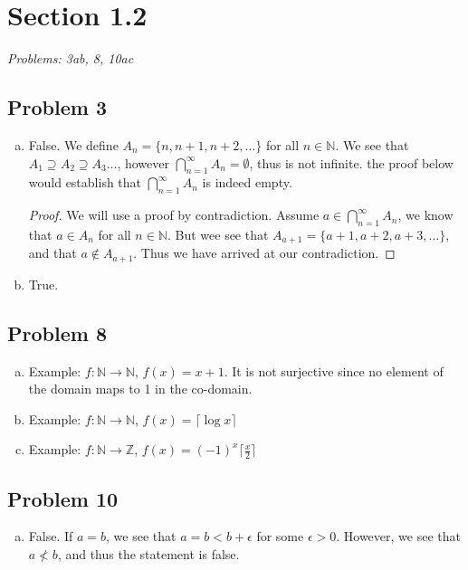 \documentclass[12pt]{article}
\begin{document}

\section*{Section 1.2}
\textit{Problems: 3ab, 8, 10ac }

\subsection*{Problem 3}
\begin{enumerate}[a).]
    \item {
    False.
    We define $A_n = \{n, n+1, n+2, \dots\}$ for all $n \in \mathbb{N}$. 
    We see that $A_1 \supseteq A_2 \supseteq A_3 \dots$, however $\bigcap_{n=1}^{\infty}A_n = \emptyset$, thus is not infinite.
    the proof below would establish that $\bigcap_{n=1}^{\infty}A_n$ is indeed empty. 

    \begin{proof}
        We will use a proof by contradiction. 
        Assume $ a \in \bigcap_{n=1}^{\infty}A_n$, we know that $a \in A_n$ for all $n \in \mathbb{N}$.
        But wee see that $A_{a+1} = \{a+1, a+2, a+3, \dots\}$, and that $a \notin A_{a+1}$. 
        Thus we have arrived at our contradiction.
    \end{proof}
    }
    \item {
    True.
    }

\end{enumerate}

\subsection*{Problem 8}

\begin{enumerate}[a).]
    \item {
        Example: $f: \mathbb{N} \rightarrow \mathbb{N}$, $f(x) = x+1$.
        It is not surjective since no element of the domain maps to 1 in the co-domain. 
    }
    \item {
    Example: $f: \mathbb{N} \rightarrow \mathbb{N}$, $f(x) = \lceil  \log{x} \rceil$
    }
    \item {
    Example: $f: \mathbb{N} \rightarrow \mathbb{Z}$, $f(x) = (-1)^{x}{\lceil \frac{x}{2}\rceil}$
    }
\end{enumerate}

\subsection*{Problem 10}
\begin{enumerate}[a).]
    \item {
        False.
        If $a = b$, we see that $a = b < b + \epsilon$ for some $\epsilon > 0$. 
        However, we see that $a \nless b$, and thus the statement is false. 
    }

\end{enumerate}
\end{document}

